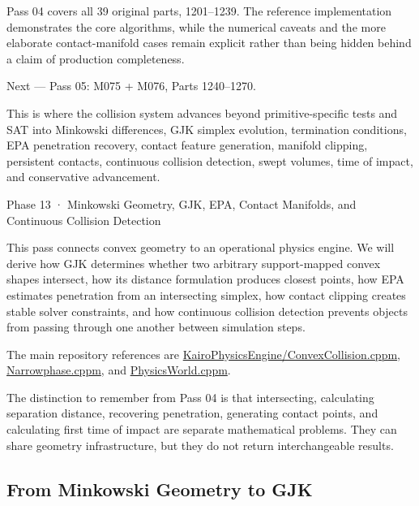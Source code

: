 Pass 04 covers all 39 original parts, 1201--1239. The reference implementation demonstrates the core algorithms, while the numerical caveats and the more elaborate contact-manifold cases remain explicit rather than being hidden behind a claim of production completeness.

Next --- Pass 05: M075 + M076, Parts 1240--1270.

This is where the collision system advances beyond primitive-specific tests and SAT into Minkowski differences, GJK simplex evolution, termination conditions, EPA penetration recovery, contact feature generation, manifold clipping, persistent contacts, continuous collision detection, swept volumes, time of impact, and conservative advancement.

Phase 13 · Minkowski Geometry, GJK, EPA, Contact Manifolds, and Continuous Collision Detection

This pass connects convex geometry to an operational physics engine. We will derive how GJK determines whether two arbitrary support-mapped convex shapes intersect, how its distance formulation produces closest points, how EPA estimates penetration from an intersecting simplex, how contact clipping creates stable solver constraints, and how continuous collision detection prevents objects from passing through one another between simulation steps.

The main repository references are \href{https://github.com/swayam8624/KairoPhysicsEngine/blob/main/ConvexCollision.cppm?utm_source=chatgpt.com}{KairoPhysicsEngine/ConvexCollision.cppm}, \href{https://github.com/swayam8624/KairoPhysicsEngine/blob/main/Narrowphase.cppm?utm_source=chatgpt.com}{Narrowphase.cppm}, and \href{https://github.com/swayam8624/KairoPhysicsEngine/blob/main/PhysicsWorld.cppm?utm_source=chatgpt.com}{PhysicsWorld.cppm}.

The distinction to remember from Pass 04 is that intersecting, calculating separation distance, recovering penetration, generating contact points, and calculating first time of impact are separate mathematical problems. They can share geometry infrastructure, but they do not return interchangeable results.

\subsection{From Minkowski Geometry to GJK}\label{04-visual-computing-ii-ch025-from-minkowski-geometry-to-gjk}

\hypertarget{04-visual-computing-ii-ch025-from-minkowski-geometry-to-gjk}{}

